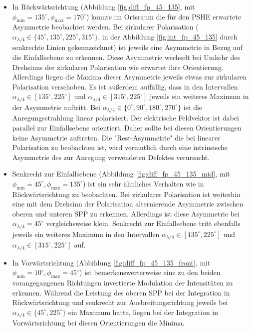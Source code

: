 \documentclass[titlepage,  ngerman]{article}
\begin{document}
			\begin{itemize}
				\item In Rückwärtsrichtung (Abbildung \ref{fig:diff_fp_45_135},  mit $\phi_\mathrm{min} =135^\circ, \phi_\mathrm{max}=170^\circ$) konnte im Ortsraum die für den PSHE erwartete Asymmetrie beobachtet werden. Bei zirkularer Polarisation ($\alpha_{\lambda/4} \in \{45^\circ, 135^\circ, 225^\circ, 315^\circ\}$, in der Abbildung \ref{fig:int_fp_45_135} durch senkrechte Linien gekennzeichnet) ist jeweils eine Asymmetrie in Bezug auf die Einfallsebene zu erkennen. Diese Asymmetrie wechselt bei Umkehr des Drehsinns der zirkularen Polarisation wie erwartet ihre Orientierung. Allerdings liegen die Maxima dieser Asymmetrie jeweils etwas zur zirkularen Polarisation verschoben. Es ist außerdem auffällig, dass in den Intervallen $\alpha_{\lambda/4} \in [135^\circ,225^\circ]$ und $\alpha_{\lambda/4} \in [315^\circ, 225^\circ]$ jeweils ein weiteres Maximum in der Asymmetrie auftritt. Bei $\alpha_{\lambda/4} \in \{0^\circ, 90^\circ, 180^\circ, 270^\circ\}$ ist die Anregungsstrahlung linear polarisiert. Der elektrische Feldvektor ist dabei parallel zur Einfallsebene orientiert. Daher sollte bei diesen Orientierungen keine Asymmetrie auftreten. Die "Rest-Asymmetrie" die bei linearer Polarisation zu beobachten ist, wird vermutlich durch eine intrinsische Asymmetrie des zur Anregung verwendeten Defektes verursacht. 
				\item Senkrecht zur Einfallsebene (Abbildung \ref{fig:diff_fp_45_135_mid},  mit $\phi_\mathrm{min} =45^\circ, \phi_\mathrm{max}=135^\circ$) ist ein sehr ähnliches Verhalten wie in Rückwärtsrichtung zu beobachten. Bei zirkularer Polarisation ist weiterhin eine mit dem Drehsinn der Polarisation alternierende Asymmetrie zwischen oberen und unteren SPP zu erkennen. Allerdings ist diese Asymmetrie bei $\alpha_{\lambda/4}=45^\circ$ vergleichsweise klein. Senkrecht zur Einfallsebene tritt ebenfalls jeweils ein weiteres Maximum in den Intervallen $\alpha_{\lambda/4} \in [135^\circ,225^\circ]$ und $\alpha_{\lambda/4} \in [315^\circ, 225^\circ]$ auf.
				\item
				In Vorwärtsrichtung (Abbildung \ref{fig:diff_fp_45_135_front},  mit  $\phi_\mathrm{min} =10^\circ, \phi_\mathrm{max}=45^\circ$) ist bemerkenswerterweise eine zu den beiden vorangegangenen Richtungen invertierte Modulation der Intensitäten zu erkennen. Während die Leistung des oberen SPP bei der Integration in Rückwärtsrichtung und senkrecht zur Ausbreitungsrichtung jeweils bei $\alpha_{\lambda /4} \in \{45^\circ, 225^\circ\}$ ein Maximum hatte, liegen bei der Integration in Vorwärtsrichtung bei diesen Orientierungen die Minima.
			\end{itemize}
		\FloatBarrier
\end{document}
